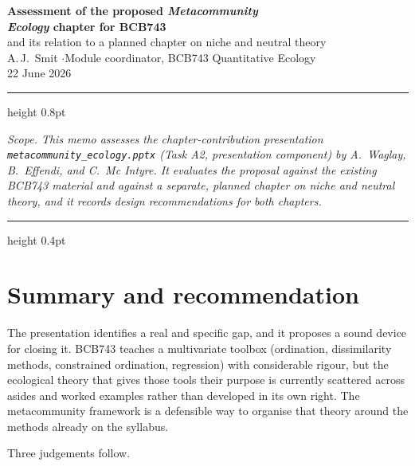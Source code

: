 \documentclass[11pt,a4paper]{article}
\newcommand{\fname}[1]{\texttt{\small #1}}
\begin{document}
\begin{center}
{\LARGE\bfseries\sffamily Assessment of the proposed \textit{Metacommunity\\ Ecology} chapter for BCB743}\\[6pt]
{\large\sffamily and its relation to a planned chapter on niche and neutral theory}\\[10pt]
{\normalsize A.\,J.\ Smit \quad$\cdot$\quad Module coordinator, BCB743 Quantitative Ecology}\\[2pt]
{\small 22 June 2026}
\end{center}

\vspace{2pt}
\hrule height 0.8pt
\vspace{6pt}

{\small\itshape Scope. This memo assesses the chapter-contribution presentation
\fname{metacommunity\_ecology.pptx} (Task A2, presentation component) by A.\ Waglay,
B.\ Effendi, and C.\ Mc Intyre. It evaluates the proposal against the existing BCB743
material and against a separate, planned chapter on niche and neutral theory, and it
records design recommendations for both chapters.}

\vspace{6pt}
\hrule height 0.4pt
\vspace{8pt}

\section{Summary and recommendation}

The presentation identifies a real and specific gap, and it proposes a sound device for
closing it. BCB743 teaches a multivariate toolbox (ordination, dissimilarity methods,
constrained ordination, regression) with considerable rigour, but the ecological theory
that gives those tools their purpose is currently scattered across asides and worked
examples rather than developed in its own right. The metacommunity framework is a
defensible way to organise that theory around the methods already on the syllabus.

Three judgements follow.
\end{document}
